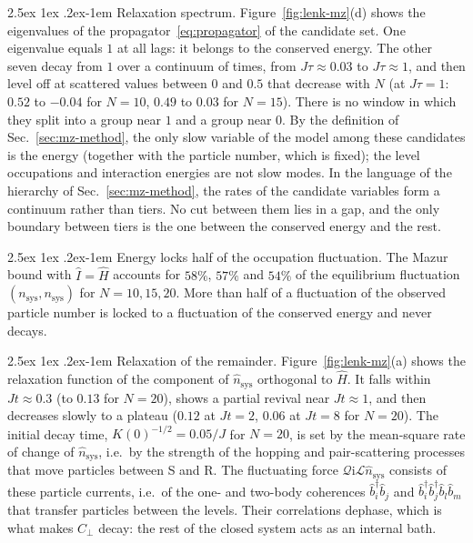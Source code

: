 \documentclass[10pt,a4paper]{article}
\makeatletter
\renewcommand{\paragraph}{\@startsection{paragraph}{4}{\z@}%
  {2.5ex \@plus 1ex \@minus .2ex}{-1em}%
  {\normalfont\fontsize{14pt}{17pt}\selectfont\bfseries}}
\newcommand{\ii}{\mathrm{i}}
\newcommand{\sprod}[2]{\left(#1 , #2\right)}
\newcommand{\LL}{\mathcal{L}}
\newcommand{\QQ}{\mathcal{Q}}
\makeatother
\begin{document}
\paragraph{Relaxation spectrum.}
Figure~\ref{fig:lenk-mz}(d) shows the eigenvalues of the propagator~\eqref{eq:propagator} of the candidate set.
One eigenvalue equals $ 1 $ at all lags: it belongs to the conserved energy.
The other seven decay from $ 1 $ over a continuum of times, from $ J\tau \approx 0.03 $ to $ J\tau \approx 1 $, and then level off at scattered values between $ 0 $ and $ 0.5 $ that decrease with $ N $ (at $ J\tau = 1 $: $ 0.52 $ to $ -0.04 $ for $ N = 10 $, $ 0.49 $ to $ 0.03 $ for $ N = 15 $).
There is no window in which they split into a group near $ 1 $ and a group near $ 0 $.
By the definition of Sec.~\ref{sec:mz-method}, the only slow variable of the model among these candidates is the energy (together with the particle number, which is fixed); the level occupations and interaction energies are not slow modes.
In the language of the hierarchy of Sec.~\ref{sec:mz-method}, the rates of the candidate variables form a continuum rather than tiers. No cut between them lies in a gap, and the only boundary between tiers is the one between the conserved energy and the rest.

\paragraph{Energy locks half of the occupation fluctuation.}
The Mazur bound with $ \hat I = \hat H $ accounts for $ 58\% $, $ 57\% $ and $ 54\% $ of the equilibrium fluctuation $ \sprod{n_{\mathrm{sys}}}{n_{\mathrm{sys}}} $ for $ N = 10, 15, 20 $.
More than half of a fluctuation of the observed particle number is locked to a fluctuation of the conserved energy and never decays.

\paragraph{Relaxation of the remainder.}
Figure~\ref{fig:lenk-mz}(a) shows the relaxation function of the component of $ \hat n_{\mathrm{sys}} $ orthogonal to $ \hat H $.
It falls within $ Jt \approx 0.3 $ (to $ 0.13 $ for $ N = 20 $), shows a partial revival near $ Jt \approx 1 $, and then decreases slowly to a plateau ($ 0.12 $ at $ Jt = 2 $, $ 0.06 $ at $ Jt = 8 $ for $ N = 20 $).
The initial decay time, $ K(0)^{-1/2} = 0.05/J $ for $ N = 20 $, is set by the mean-square rate of change of $ \hat n_{\mathrm{sys}} $, i.e.\ by the strength of the hopping and pair-scattering processes that move particles between S and R.
The fluctuating force $ \QQ\ii\LL\hat n_{\mathrm{sys}} $ consists of these particle currents, i.e.\ of the one- and two-body coherences $ \hat b_i^\dagger \hat b_j $ and $ \hat b_i^\dagger \hat b_j^\dagger \hat b_l \hat b_m $ that transfer particles between the levels. Their correlations dephase, which is what makes $ C_\perp $ decay: the rest of the closed system acts as an internal bath.
\end{document}
